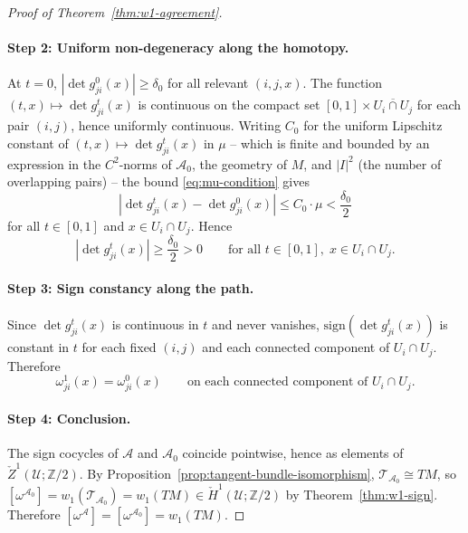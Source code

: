 \documentclass[11pt]{article}
\newcommand{\Z}{\mathbb{Z}}
\newcommand{\sign}{\mathrm{sign}}
\theoremstyle{plain}
\theoremstyle{definition}
\theoremstyle{remark}
\begin{document}
\begin{appendices}
\begin{proof}[Proof of Theorem~\ref{thm:w1-agreement}]
\paragraph{Step 2: Uniform non-degeneracy along the homotopy.}
At $t = 0$, $|\det g_{ji}^0(x)| \geq \delta_0$ for all relevant $(i, j, x)$. The function $(t, x) \mapsto \det g_{ji}^t(x)$ is continuous on the compact set $[0, 1] \times \overline{U_i \cap U_j}$ for each pair $(i, j)$, hence uniformly continuous. Writing $C_0$ for the uniform Lipschitz constant of $(t, x) \mapsto \det g_{ji}^t(x)$ in $\mu$ -- which is finite and bounded by an expression in the $C^2$-norms of $\mathcal{A}_0$, the geometry of $M$, and $|I|^2$ (the number of overlapping pairs) -- the bound \eqref{eq:mu-condition} gives
\[
|\det g_{ji}^t(x) - \det g_{ji}^0(x)| \leq C_0 \cdot \mu < \frac{\delta_0}{2}
\]
for all $t \in [0, 1]$ and $x \in U_i \cap U_j$. Hence
\[
|\det g_{ji}^t(x)| \geq \frac{\delta_0}{2} > 0 \qquad \text{for all } t \in [0, 1],\; x \in U_i \cap U_j.
\]

\paragraph{Step 3: Sign constancy along the path.}
Since $\det g_{ji}^t(x)$ is continuous in $t$ and never vanishes, $\sign(\det g_{ji}^t(x))$ is constant in $t$ for each fixed $(i, j)$ and each connected component of $U_i \cap U_j$. Therefore
\[
\omega_{ji}^1(x) = \omega_{ji}^0(x) \qquad \text{on each connected component of } U_i \cap U_j.
\]

\paragraph{Step 4: Conclusion.}
The sign cocycles of $\mathcal{A}$ and $\mathcal{A}_0$ coincide pointwise, hence as elements of $\check{Z}^1(\mathcal{U}; \Z/2)$. By Proposition~\ref{prop:tangent-bundle-isomorphism}, $\mathcal{T}_{\mathcal{A}_0} \cong TM$, so $[\omega^{\mathcal{A}_0}] = w_1(\mathcal{T}_{\mathcal{A}_0}) = w_1(TM) \in \check{H}^1(\mathcal{U}; \Z/2)$ by Theorem~\ref{thm:w1-sign}. Therefore $[\omega^{\mathcal{A}}] = [\omega^{\mathcal{A}_0}] = w_1(TM)$.
\end{proof}




\end{appendices}
\end{document}
